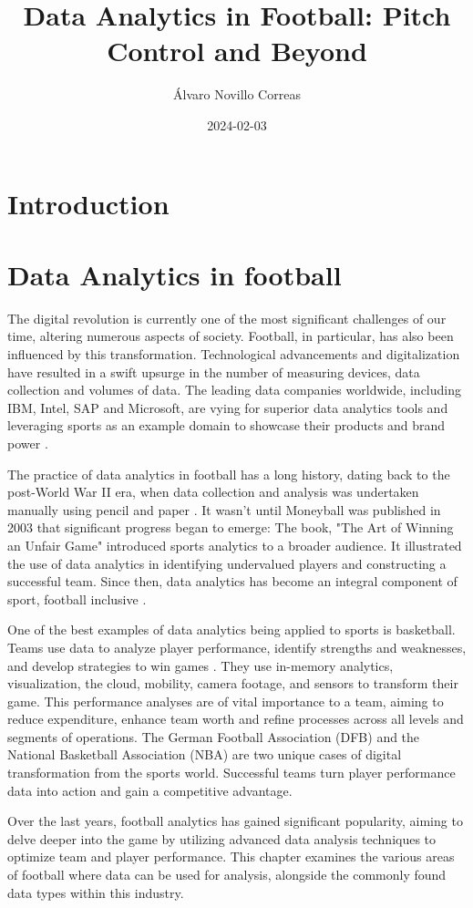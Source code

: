 \documentclass[twoside,nohyper]{tufte-book}
\title{Data Analytics in Football: Pitch Control and Beyond}
\author{Álvaro Novillo Correas}
\date{2024-02-03}
\begin{document}
\maketitle



{
\setcounter{tocdepth}{1}
\tableofcontents
}

\hypertarget{introduction}{%
\chapter{Introduction}\label{introduction}}

\hypertarget{data-analytics-in-football}{%
\chapter{Data Analytics in football}\label{data-analytics-in-football}}

The digital revolution is currently one of the most significant
challenges of our time, altering numerous aspects of society. Football,
in particular, has also been influenced by this transformation.
Technological advancements and digitalization have resulted in a swift
upsurge in the number of measuring devices, data collection and volumes
of data. The leading data companies worldwide, including IBM, Intel, SAP
and Microsoft, are vying for superior data analytics tools and
leveraging sports as an example domain to showcase their products and
brand power \citep{1}.

The practice of data analytics in football has a long history, dating
back to the post-World War II era, when data collection and analysis was
undertaken manually using pencil and paper \citep{1}. It wasn't until
Moneyball was published in 2003 that significant progress began to
emerge: The book, "The Art of Winning an Unfair Game" introduced
sports analytics to a broader audience. It illustrated the use of data
analytics in identifying undervalued players and constructing a
successful team. Since then, data analytics has become an integral
component of sport, football inclusive \citep{1}.

One of the best examples of data analytics being applied to sports is
basketball. Teams use data to analyze player performance, identify
strengths and weaknesses, and develop strategies to win games \citep{2}. They
use in-memory analytics, visualization, the cloud, mobility, camera
footage, and sensors to transform their game. This performance analyses
are of vital importance to a team, aiming to reduce expenditure, enhance
team worth and refine processes across all levels and segments of
operations. The German Football Association (DFB) and the National
Basketball Association (NBA) are two unique cases of digital
transformation from the sports world. Successful teams turn player
performance data into action and gain a competitive advantage.

Over the last years, football analytics has gained significant
popularity, aiming to delve deeper into the game by utilizing advanced
data analysis techniques to optimize team and player performance. This
chapter examines the various areas of football where data can be used
for analysis, alongside the commonly found data types within this
industry.


\end{document}
